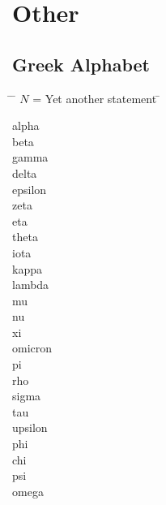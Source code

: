 \documentclass[../formulario.tex]{subfiles}
\begin{document}
\chapter{Other}

\section{Greek Alphabet}

\begin{multicols}{3}
\begin{tabbing}
\hspace{2em} \= \hspace{3em} \= $N$ = Yet another statement \= \kill

\textAlpha    \>  \textalpha    \>  alpha    \\
\textBeta     \>  \textbeta     \>  beta     \\
\textGamma    \>  \textgamma    \>  gamma    \\
\textDelta    \>  \textdelta    \>  delta    \\
\textEpsilon  \>  \textepsilon  \straightepsilon  \>  epsilon  \\
\textZeta     \>  \textzeta     \>  zeta     \\
\textEta      \>  \texteta      \>  eta      \\
\textTheta    \>  \texttheta  \straighttheta   \>  theta    \\
\textIota     \>  \textiota     \>  iota     \\
\textKappa    \>  \textkappa    \>  kappa    \\
\textLambda   \>  \textlambda   \>  lambda   \\
\textMu       \>  \textmu       \>  mu       \\
\textNu       \>  \textnu       \>  nu       \\
\textXi       \>  \textxi       \>  xi       \\
\textOmikron  \>  \textomikron  \>  omicron  \\
\textPi       \>  \textpi       \>  pi       \\
\textRho      \>  \textrho      \>  rho      \\
\textSigma    \>  \textsigma    \>  sigma    \\
\textTau      \>  \texttau      \>  tau      \\
\textUpsilon  \>  \textupsilon  \>  upsilon  \\
\textPhi      \>  \textphi  \straightphi    \>  phi      \\
\textChi      \>  \textchi      \>  chi      \\
\textPsi      \>  \textpsi      \>  psi      \\
\textOmega    \>  \textomega    \>  omega    \\

\end{tabbing}
\end{multicols}
\end{document}

